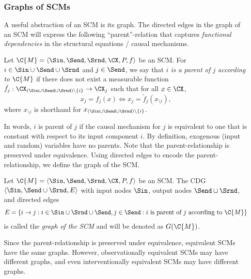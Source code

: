 \subsubsection{Graphs of SCMs}

A useful abstraction of an SCM is its graph. 
The directed edges in the graph of an SCM will express the following ``parent''-relation that captures \emph{functional dependencies} in the structural equations / causal mechanisms.
\begin{Def}\label{def:scm_parent}
  Let $\C{M} = \langle \Sin, \Send, \Srnd, \CX, P, f \rangle$ be an SCM.
  For $i \in \Sin \cup \Send \cup \Srnd$ and $j \in \Send$, we say that
  \emph{$i$ is a parent of $j$ according to $\C{M}$} if there does not exist a measurable function 
  $\tilde f_j : \CX_{(\Sin\cup\Send\cup\Srnd) \setminus \{i\}} \to \CX_j$
  such that for all $x \in \CX$,
  $$x_j = f_j(x) \iff x_j = \tilde f_j(x_{\setminus i}),$$
  where $x_{\setminus i}$ is shorthand for $x_{(\Sin\cup\Send\cup\Srnd)\setminus\{i\}}$.
\end{Def}
In words, $i$ is parent of $j$ if the causal mechanism for $j$ is equivalent to one that is constant with respect to its input component $i$.
By definition, exogenous (input and random) variables have no parents.
Note that the parent-relationship is preserved under equivalence.
Using directed edges to encode the parent-relationship, we define the graph of the SCM.
\begin{Def}\label{def:scm_graph}
  Let $\C{M} = \langle \Sin, \Send, \Srnd, \CX, P, f \rangle$ be an SCM.
  The CDG $\langle \Sin, \Send \cup \Srnd, E \rangle$ with
  input nodes $\Sin$, output nodes $\Send\cup\Srnd$, and
  directed edges 
  $$E = \{i \to j : i \in \Sin\cup\Srnd\cup\Send, j\in\Send: \text{$i$ is parent of $j$ according to $\C{M}$}\}$$
  is called the \emph{graph of the SCM} and will be denoted as $G(\C{M})$.
\end{Def}
Since the parent-relationship is preserved under equivalence, equivalent SCMs have the same graphs.
However, observationally equivalent SCMs may have different graphs, and even interventionally equivalent
SCMs may have different graphs.

